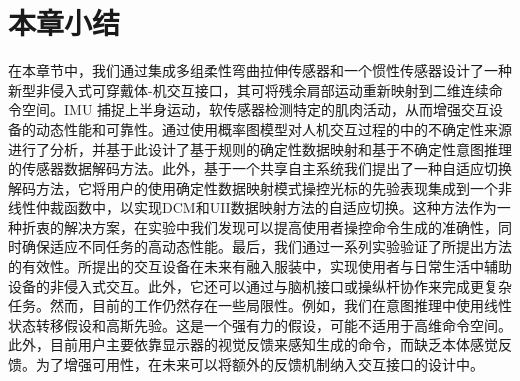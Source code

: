 \section{本章小结}在本章节中，我们通过集成多组柔性弯曲拉伸传感器和一个惯性传感器设计了一种新型非侵入式可穿戴体-机交互接口，其可将残余肩部运动重新映射到二维连续命令空间。IMU 捕捉上半身运动，软传感器检测特定的肌肉活动，从而增强交互设备的动态性能和可靠性。通过使用概率图模型对人机交互过程的中的不确定性来源进行了分析，并基于此设计了基于规则的确定性数据映射和基于不确定性意图推理的传感器数据解码方法。此外，基于一个共享自主系统我们提出了一种自适应切换解码方法，它将用户的使用确定性数据映射模式操控光标的先验表现集成到一个非线性仲裁函数中，以实现DCM和UII数据映射方法的自适应切换。这种方法作为一种折衷的解决方案，在实验中我们发现可以提高使用者操控命令生成的准确性，同时确保适应不同任务的高动态性能。最后，我们通过一系列实验验证了所提出方法的有效性。所提出的交互设备在未来有融入服装中，实现使用者与日常生活中辅助设备的非侵入式交互。此外，它还可以通过与脑机接口或操纵杆协作来完成更复杂任务。然而，目前的工作仍然存在一些局限性。例如，我们在意图推理中使用线性状态转移假设和高斯先验。这是一个强有力的假设，可能不适用于高维命令空间。此外，目前用户主要依靠显示器的视觉反馈来感知生成的命令，而缺乏本体感觉反馈。为了增强可用性，在未来可以将额外的反馈机制纳入交互接口的设计中。

